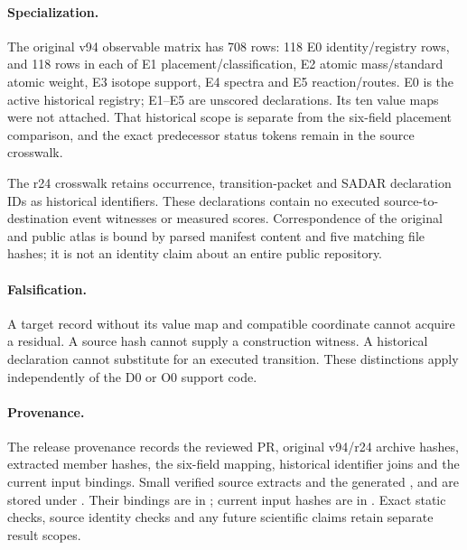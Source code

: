 \paragraph{Specialization.}
The original v94 observable matrix has 708 rows: 118 E0 identity/registry rows,
and 118 rows in each of E1 placement/classification, E2 atomic mass/standard
atomic weight, E3 isotope support, E4 spectra and E5 reaction/routes. E0 is the
active historical registry; E1--E5 are unscored declarations. Its ten value maps
were not attached. That historical scope is separate from the six-field
placement comparison, and the exact predecessor status tokens remain in the
source crosswalk.

The r24 crosswalk retains occurrence, transition-packet and SADAR declaration
IDs as historical identifiers. These declarations contain no executed
source-to-destination event witnesses or measured scores. Correspondence of
the original and public atlas is bound by parsed manifest content and five
matching file hashes; it is not an identity claim about an entire public
repository.

\paragraph{Falsification.}
A target record without its value map and compatible coordinate cannot acquire
a residual. A source hash cannot supply a construction witness. A historical
declaration cannot substitute for an executed transition. These distinctions
apply independently of the D0 or O0 support code.

\paragraph{Provenance.}
The release provenance records the reviewed PR, original v94/r24 archive hashes, extracted member hashes, the six-field mapping, historical identifier joins and the current input bindings. Small verified source extracts and the generated ,  and  are stored under . Their bindings are in ; current input hashes are in . Exact static checks, source identity checks and any future scientific claims retain separate result scopes.

